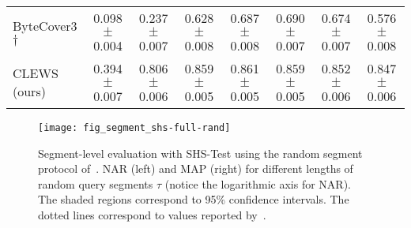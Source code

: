 \begin{table*}[h]
\begin{adjustbox}{max width=\textwidth}
\begin{sc}
\begin{tabular}{lccccccc}
ByteCover3 $\dag$ & 0.098 $\pm$ 0.004 & 0.237 $\pm$ 0.007 & 0.628 $\pm$ 0.008 & 0.687 $\pm$ 0.008 & 0.690 $\pm$ 0.007 & 0.674 $\pm$ 0.007 & 0.576 $\pm$ 0.008 \\
CLEWS (ours) & 0.394 $\pm$ 0.007 & 0.806 $\pm$ 0.006 & 0.859 $\pm$ 0.005 & 0.861 $\pm$ 0.005 & 0.859 $\pm$ 0.005 & 0.852 $\pm$ 0.006 & 0.847 $\pm$ 0.006 \\
\bottomrule
\end{tabular}
\end{sc}
\end{adjustbox}
\end{table*}


\begin{figure}[h]
\centerline{\texttt{[image: fig\_segment\_shs-full-rand]}}
\vskip -0.15in
\caption{Segment-level evaluation with SHS-Test using the random segment protocol of~\citet{du_bytecover3_2023}. NAR (left) and MAP (right) for different lengths of random query segments $\tau$ (notice the logarithmic axis for NAR). The shaded regions correspond to 95\% confidence intervals. The dotted lines correspond to values reported by~\citet{du_bytecover3_2023}.}
\label{fig:seg_shsrand}
\end{figure}


